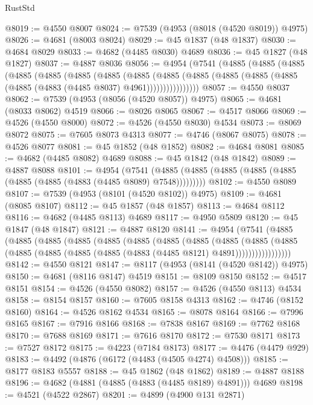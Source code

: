 \begin{lexlean}{RustStd}
\begin{coremodule}
@8019 := @4550 @8007
@8024 := @7539 (@4953 (@8018 (@4520 @8019)) @4975)
@8026 := @4681 (@8003 @8024)
@8029 := @45 @1837 (@48 @1837)
@8030 := @4684 @8029
@8033 := @4682 (@4485 @8030) @4689
@8036 := @45 @1827 (@48 @1827)
@8037 := @4887 @8036
@8056 := @4954
    (@7541
      (@4885
        (@4885
          (@4885
            (@4885
              (@4885
                (@4885
                  (@4885
                    (@4885
                      (@4885
                        (@4885
                          (@4885 (@4885 (@4885 (@4885 (@4883 (@4485 @8037) @4961))))))))))))))))
@8057 := @4550 @8037
@8062 := @7539 (@4953 (@8056 (@4520 @8057)) @4975)
@8065 := @4681 (@8033 @8062) @4519
@8066 := @8026 @8065
@8067 := @4517 @8066
@8069 := @4526 (@4550 @8000)
@8072 := @4526 (@4550 @8030) @4534
@8073 := @8069 @8072
@8075 := @7605 @8073 @4313
@8077 := @4746 (@8067 @8075)
@8078 := @4526 @8077
@8081 := @45 @1852 (@48 @1852)
@8082 := @4684 @8081
@8085 := @4682 (@4485 @8082) @4689
@8088 := @45 @1842 (@48 @1842)
@8089 := @4887 @8088
@8101 := @4954
    (@7541 (@4885 (@4885 (@4885 (@4885 (@4885 (@4885 (@4885 (@4883 (@4485 @8089) @7548)))))))))
@8102 := @4550 @8089
@8107 := @7539 (@4953 (@8101 (@4520 @8102)) @4975)
@8109 := @4681 (@8085 @8107)
@8112 := @45 @1857 (@48 @1857)
@8113 := @4684 @8112
@8116 := @4682 (@4485 @8113) @4689
@8117 := @4950 @5809
@8120 := @45 @1847 (@48 @1847)
@8121 := @4887 @8120
@8141 := @4954
    (@7541
      (@4885
        (@4885
          (@4885
            (@4885
              (@4885
                (@4885
                  (@4885
                    (@4885
                      (@4885
                        (@4885
                          (@4885
                            (@4885 (@4885 (@4885 (@4885 (@4883 (@4485 @8121) @4891)))))))))))))))))
@8142 := @4550 @8121
@8147 := @8117 (@4953 (@8141 (@4520 @8142)) @4975)
@8150 := @4681 (@8116 @8147) @4519
@8151 := @8109 @8150
@8152 := @4517 @8151
@8154 := @4526 (@4550 @8082)
@8157 := @4526 (@4550 @8113) @4534
@8158 := @8154 @8157
@8160 := @7605 @8158 @4313
@8162 := @4746 (@8152 @8160)
@8164 := @4526 @8162 @4534
@8165 := @8078 @8164
@8166 := @7996 @8165
@8167 := @7916 @8166
@8168 := @7838 @8167
@8169 := @7762 @8168
@8170 := @7688 @8169
@8171 := @7616 @8170
@8172 := @7530 @8171
@8173 := @7527 @8172
@8175 := @4223 (@7184 @8173)
@8177 := @4476 (@4479 @929)
@8183 := @4492 (@4876 (@6172 (@4483 (@4505 @4274) @4508)))
@8185 := @8177 @8183 @5557
@8188 := @45 @1862 (@48 @1862)
@8189 := @4887 @8188
@8196 := @4682 (@4881 (@4885 (@4883 (@4485 @8189) @4891))) @4689
@8198 := @4521 (@4522 @2867)
@8201 := @4899 (@4900 @131 @2871)

\end{coremodule}
\end{lexlean}
